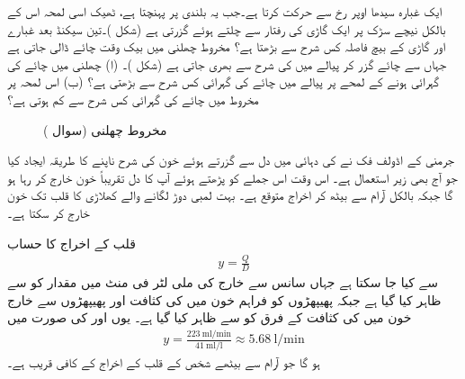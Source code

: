 ایک غبارہ سیدھا اوپر رخ  سے  حرکت کرتا ہے۔جب یہ  بلندی پر پہنچتا ہے، ٹھیک اسی لمحہ اس کے بالکل نیچے سڑک پر ایک گاڑی  کی رفتار سے چلتے ہوئے گزرتی ہے (شکل )۔تین سیکنڈ بعد غبارے اور گاڑی کے بیچ فاصلہ کس شرح سے بڑھتا ہے؟  
مخروط چھلنی میں بیک وقت چائے ڈالی جاتی ہے جہاں سے  چائے گزر کر پیالے میں  کی  شرح سے بھری جاتی ہے (شکل )۔ (ا) چھلنی میں چائے کی گہرائی  ہونے کے لمحے پر پیالے میں چائے کی گہرائی کس شرح سے بڑھتی ہے؟ (ب) اس لمحہ پر مخروط میں چائے کی گہرائی کس شرح سے کم ہوتی ہے؟
\begin{figure}
\centering
{}
\caption{مخروط چھلنی (سوال )}
\label{شکل_سوال_تفرق_مخروط_چھلنی}
\end{figure}
جرمنی کے اڈولف فک نے  کی دہائی میں دل سے گزرتے ہوئے خون کی  شرح ناپنے کا طریقہ ایجاد کیا جو آج بھی زیر استعمال ہے۔ اس وقت اس جملے کو پڑھتے ہوئے آپ کا دل تقریباً  خون خارج کر رہا ہو گا جبکہ بالکل آرام سے بیٹھ کر  اخراج متوقع ہے۔ بہت لمبی دوڑ لگانے والے کھلاڑی کا قلب   تک خون خارج کر سکتا ہے۔

قلب کے اخراج کا حساب
\begin{align*}
y=\frac{Q}{D}
\end{align*}
سے کیا جا سکتا ہے جہاں سانس سے خارج  کی  ملی لٹر فی منٹ میں مقدار کو  سے ظاہر کیا گیا ہے جبکہ پھیپھڑوں کو فراہم خون میں  کی کثافت  اور پھیپھڑوں سے خارج خون میں  کی کثافت کے فرق کو  سے ظاہر کیا گیا ہے۔ یوں  اور  کی صورت میں 
\begin{align*}
y=\frac{\SI{223}{\milli\litre/\minute}}{\SI{41}{\milli\litre/\litre}}\approx \SI{5.68}{\litre/\minute}
\end{align*}
ہو گا جو آرام سے بیٹھے شخص کے قلب کے اخراج کے کافی قریب ہے۔

